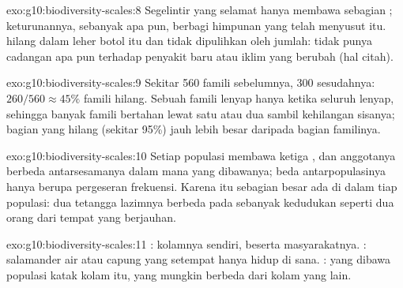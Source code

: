 \begin{solution}{exo:g10:biodiversity-scales:8}
Segelintir yang selamat hanya membawa sebagian  ;
keturunannya, sebanyak apa pun, berbagi himpunan yang telah menyusut
itu.  hilang dalam leher botol itu dan tidak
dipulihkan oleh jumlah:  tidak punya cadangan apa pun
terhadap penyakit baru atau iklim yang berubah (hal citah).
\end{solution}

\begin{solution}{exo:g10:biodiversity-scales:9}
Sekitar 560 famili sebelumnya, 300 sesudahnya: $260/560 \approx 45\%$
famili hilang. Sebuah famili lenyap hanya ketika seluruh 
lenyap, sehingga banyak famili bertahan lewat satu atau dua 
sambil kehilangan sisanya; bagian  yang hilang (sekitar
95\%) jauh lebih besar daripada bagian familinya.
\end{solution}

\begin{solution}{exo:g10:biodiversity-scales:10}
Setiap populasi membawa ketiga , dan anggotanya berbeda
antarsesamanya dalam  mana yang dibawanya; beda antarpopulasinya
hanya berupa pergeseran frekuensi. Karena itu sebagian besar
  ada di dalam tiap populasi: dua
tetangga lazimnya berbeda pada sebanyak kedudukan seperti dua orang
dari tempat yang berjauhan.
\end{solution}

\begin{solution}{exo:g10:biodiversity-scales:11}
: kolamnya sendiri, beserta masyarakatnya. : salamander
air atau capung yang setempat hanya hidup di sana. :  yang
dibawa populasi katak kolam itu, yang mungkin berbeda dari  kolam
yang lain.
\end{solution}

